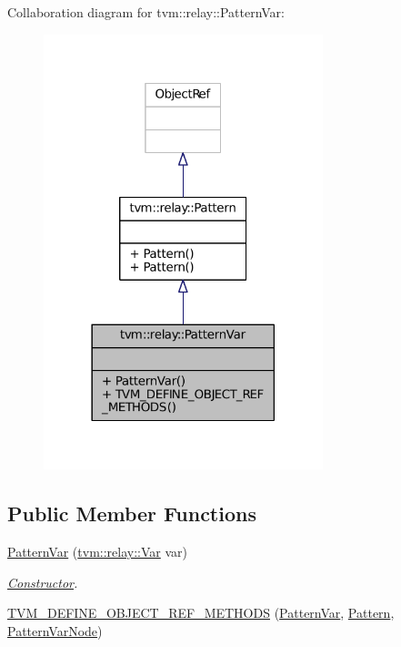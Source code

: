 Collaboration diagram for tvm\+:\+:relay\+:\+:Pattern\+Var\+:
\nopagebreak
\begin{figure}[H]
\begin{center}
\leavevmode
\includegraphics[width=230pt]{classtvm_1_1relay_1_1PatternVar__coll__graph}
\end{center}
\end{figure}
\subsection*{Public Member Functions}
\begin{DoxyCompactItemize}
\item 
\hyperlink{classtvm_1_1relay_1_1PatternVar_a54c56ad693111a8375e55961bd9b49fa}{Pattern\+Var} (\hyperlink{classtvm_1_1relay_1_1Var}{tvm\+::relay\+::\+Var} var)
\begin{DoxyCompactList}\small\item\em \hyperlink{classtvm_1_1Constructor}{Constructor}. \end{DoxyCompactList}\item 
\hyperlink{classtvm_1_1relay_1_1PatternVar_a1374627ca994ce87bd1a48faba432e39}{T\+V\+M\+\_\+\+D\+E\+F\+I\+N\+E\+\_\+\+O\+B\+J\+E\+C\+T\+\_\+\+R\+E\+F\+\_\+\+M\+E\+T\+H\+O\+DS} (\hyperlink{classtvm_1_1relay_1_1PatternVar}{Pattern\+Var}, \hyperlink{classtvm_1_1relay_1_1Pattern}{Pattern}, \hyperlink{classtvm_1_1relay_1_1PatternVarNode}{Pattern\+Var\+Node})
\end{DoxyCompactItemize}
